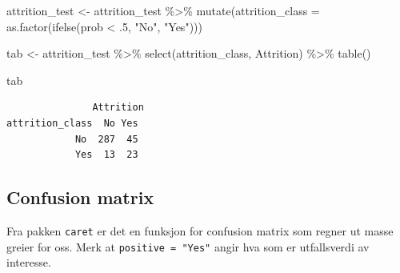 \documentclass[
  letterpaper,
  DIV=11,
  numbers=noendperiod]{scrreprt}
\newenvironment{Shaded}{\begin{snugshade}}{\end{snugshade}}
\newcommand{\AttributeTok}[1]{\textcolor[rgb]{0.40,0.45,0.13}{#1}}
\newcommand{\DecValTok}[1]{\textcolor[rgb]{0.68,0.00,0.00}{#1}}
\newcommand{\FunctionTok}[1]{\textcolor[rgb]{0.28,0.35,0.67}{#1}}
\newcommand{\NormalTok}[1]{\textcolor[rgb]{0.00,0.23,0.31}{#1}}
\newcommand{\OtherTok}[1]{\textcolor[rgb]{0.00,0.23,0.31}{#1}}
\newcommand{\SpecialCharTok}[1]{\textcolor[rgb]{0.37,0.37,0.37}{#1}}
\newcommand{\StringTok}[1]{\textcolor[rgb]{0.13,0.47,0.30}{#1}}
\begin{document}
\begin{Shaded}
\begin{Highlighting}[]
\NormalTok{attrition\_test }\OtherTok{\textless{}{-}}\NormalTok{ attrition\_test }\SpecialCharTok{\%\textgreater{}\%}
  \FunctionTok{mutate}\NormalTok{(}\AttributeTok{attrition\_class =} \FunctionTok{as.factor}\NormalTok{(}\FunctionTok{ifelse}\NormalTok{(prob }\SpecialCharTok{\textless{}}\NormalTok{ .}\DecValTok{5}\NormalTok{, }\StringTok{"No"}\NormalTok{, }\StringTok{"Yes"}\NormalTok{)))}

\NormalTok{tab }\OtherTok{\textless{}{-}}\NormalTok{ attrition\_test }\SpecialCharTok{\%\textgreater{}\%}
  \FunctionTok{select}\NormalTok{(attrition\_class, Attrition) }\SpecialCharTok{\%\textgreater{}\%}
  \FunctionTok{table}\NormalTok{()}

\NormalTok{tab}
\end{Highlighting}
\end{Shaded}

\begin{verbatim}
               Attrition
attrition_class  No Yes
            No  287  45
            Yes  13  23
\end{verbatim}

\subsection{Confusion matrix}\label{confusion-matrix}

Fra pakken \texttt{caret} er det en funksjon for confusion matrix som
regner ut masse greier for oss. Merk at \texttt{positive\ =\ "Yes"}
angir hva som er utfallsverdi av interesse.

\begin{Shaded}
\end{Shaded}
\end{document}
